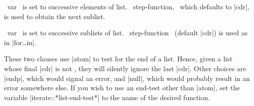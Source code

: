 \begin{clauses}

~var~ is set to successive elements of list.
~step-function,~ which
defaults to |cdr|, is used to obtain the next sublist.

~var~ is set to successive sublists of list.
~step-function~ (default |cdr|) is used as in |for\dots in|.

\end{clauses}

\medskip

These two clauses use |atom| to test for the end
of a list.  Hence, given a list whose final |cdr| is not \nil,
they will silently ignore the last |cdr|.  Other choices are
|endp|,  which would signal an error, and |null|, which
would probably result in an error somewhere else.  If you wish to use
an end-test other than |atom|, set the variable
|iterate::*list-end-test*| to the name of
the desired function.

